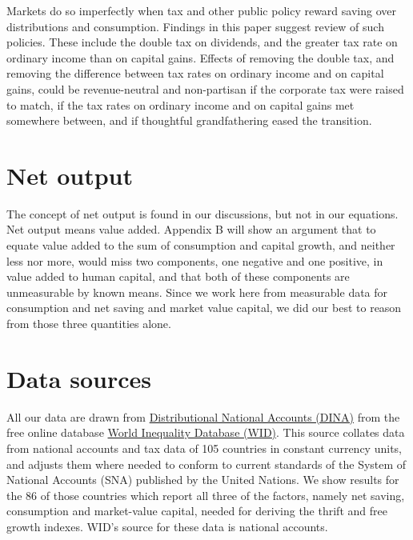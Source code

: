 \documentclass[a4paper,fleqn]{latex_styles/cas-sc}
\begin{document}
%

%
Markets do so imperfectly when tax and other public policy reward
saving over distributions and consumption. Findings in this paper
suggest review of such policies. These include the double tax on
dividends, and the greater tax rate on ordinary income than on capital
gains. Effects of removing the double tax, and removing the difference
between tax rates on ordinary income and on capital gains, could be
revenue-neutral and non-partisan if the corporate tax were raised to
match, if the tax rates on ordinary income and on capital gains met
somewhere between, and if thoughtful grandfathering eased the
transition.
%
\hypertarget{net-output}{
\section{Net output}\label{net-output}
}
The concept of net output is found in our discussions, but not in our equations. Net output means value added. Appendix B will show an argument that to equate value added to the sum of consumption and capital growth, and neither less nor more, would miss two components, one negative and one positive, in value added to human capital, and that both of these components are unmeasurable by known means. Since we work here from measurable data for consumption and net saving and market value capital, we did our best to reason from those three quantities alone.
%
\FloatBarrier

\FloatBarrier



\hypertarget{data-sources}{%
\section{Data sources}\label{data-sources}}

All our data are drawn from \href{https://wid.world/document/distributional-national-accounts-guidelines-2020-concepts-and-methods-used-in-the-world-inequality-database/}{Distributional National Accounts (DINA)} from the free online database \href{wid.world.com}{World
Inequality Database (WID)}. This source collates data from national accounts and tax data
of 105 countries in constant currency units, and adjusts them where needed to conform to current standards of the System of National Accounts
(SNA) published by the United Nations. We show results for the 86 of
those countries which report all three of the factors, namely net
saving, consumption and market-value capital, needed for deriving
the thrift and free growth indexes. WID's source for these data is national accounts.
\end{document}
